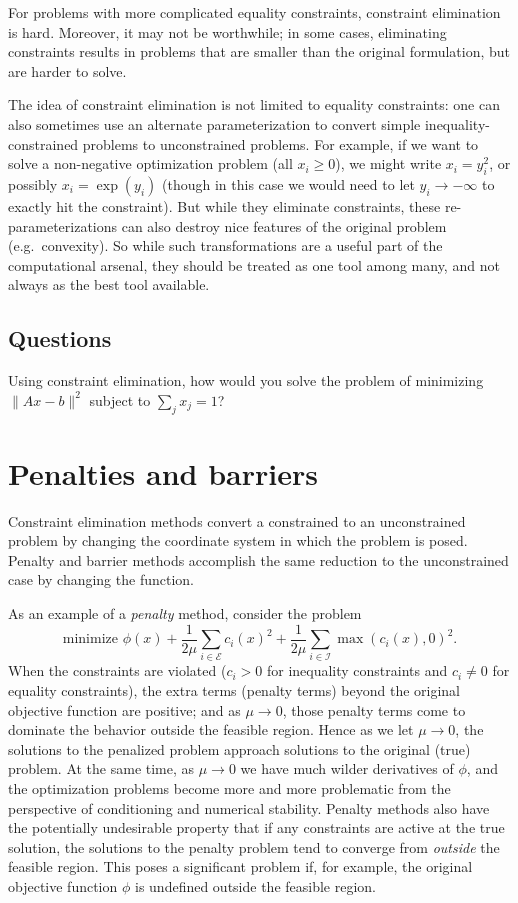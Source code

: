 \documentclass[12pt, leqno]{article} %
\begin{document}
For problems with more complicated equality constraints, constraint
elimination is hard. Moreover, it may not be worthwhile; in some cases,
eliminating constraints results in problems that are smaller than the
original formulation, but are harder to solve.

The idea of constraint elimination is not limited to equality
constraints: one can also sometimes use an alternate parameterization to
convert simple inequality-constrained problems to unconstrained
problems. For example, if we want to solve a non-negative optimization
problem (all \(x_i \geq 0\)), we might write \(x_i = y_i^2\), or
possibly \(x_i = \exp(y_i)\) (though in this case we would need to let
\(y_i \rightarrow -\infty\) to exactly hit the constraint). But while
they eliminate constraints, these re-parameterizations can also destroy
nice features of the original problem (e.g.~convexity). So while such
transformations are a useful part of the computational arsenal, they
should be treated as one tool among many, and not always as the best
tool available.

\subsection{Questions}

Using constraint elimination, how would you solve the problem of
minimizing \(\|Ax-b\|^2\) subject to \(\sum_j x_j = 1\)?

\section{Penalties and barriers}

Constraint elimination methods convert a constrained to an unconstrained
problem by changing the coordinate system in which the problem is posed.
Penalty and barrier methods accomplish the same reduction to the
unconstrained case by changing the function.

As an example of a \emph{penalty} method, consider the problem
\[\mbox{minimize } \phi(x) + \frac{1}{2\mu} \sum_{i\in \mathcal{E}}
  c_i(x)^2 + \frac{1}{2\mu} \sum_{i \in \mathcal{I}} \max(c_i(x),0)^2.\]
When the constraints are violated (\(c_i > 0\) for inequality
constraints and \(c_i \neq 0\) for equality constraints), the extra
terms (penalty terms) beyond the original objective function are
positive; and as \(\mu \rightarrow 0\), those penalty terms come to
dominate the behavior outside the feasible region. Hence as we let
\(\mu \rightarrow 0\), the solutions to the penalized problem approach
solutions to the original (true) problem. At the same time, as
\(\mu \rightarrow 0\) we have much wilder derivatives of \(\phi\), and
the optimization problems become more and more problematic from the
perspective of conditioning and numerical stability. Penalty methods
also have the potentially undesirable property that if any constraints
are active at the true solution, the solutions to the penalty problem
tend to converge from \emph{outside} the feasible region. This poses a
significant problem if, for example, the original objective function
\(\phi\) is undefined outside the feasible region.
\end{document}
